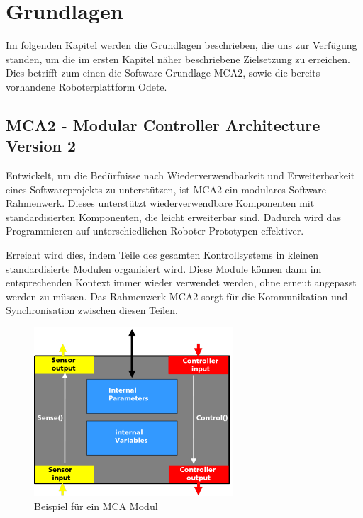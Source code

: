 \chapter{Grundlagen}
\label{grundlagen_cha}

Im folgenden Kapitel werden die Grundlagen beschrieben, die uns zur Verfügung standen,
 um die im ersten Kapitel näher beschriebene Zielsetzung zu erreichen. Dies betrifft zum einen die
 Software-Grundlage MCA2, sowie die bereits vorhandene Roboterplattform Odete.

\section{MCA2 - Modular Controller Architecture Version 2}
\authorsection{\editoranne}

Entwickelt, um die Bedürfnisse nach Wiederverwendbarkeit und Erweiterbarkeit eines Softwareprojekts zu unterstützen,
 ist MCA2 ein modulares Software-Rahmenwerk. Dieses unterstützt wiederverwendbare Komponenten mit standardisierten Komponenten,
 die leicht erweiterbar sind. Dadurch wird das Programmieren auf unterschiedlichen Roboter-Prototypen effektiver.

Erreicht wird dies, indem Teile des gesamten Kontrollsystems in kleinen standardisierte Modulen organisiert wird.
 Diese Module können dann im entsprechenden Kontext immer wieder verwendet werden, ohne erneut angepasst werden zu müssen.
 Das Rahmenwerk MCA2 sorgt für die Kommunikation und Synchronisation zwischen diesen Teilen.

\begin{figure}[h]
	\center
	\includegraphics[scale=2.0]{graphics/mcamodule.png}
	\caption{\label{fig:MCA-Modul} Beispiel für ein MCA Modul}
\end{figure}


